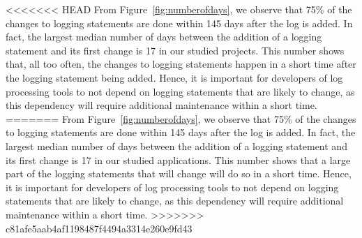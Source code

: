 <<<<<<< HEAD
From Figure~\ref{fig:numberofdays}, we observe that 75\% of the changes to logging statements are done within 145 days after the log is added. In fact, the largest median number of days between the addition of a logging statement and its first change is 17 in our studied projects. This number shows that, all too often, the changes to logging statements happen in a short time after the logging statement being added. Hence, it is important for developers of log processing tools to not depend on logging statements that are likely to change, as this dependency will require additional maintenance within a short time.
=======
From Figure~\ref{fig:numberofdays}, we observe that 75\% of the changes to logging statements are done within 145 days after the log is added. In fact, the largest median number of days between the addition of a logging statement and its first change is 17 in our studied applications. This number shows that a large part of the logging statements that will change will do so in a short time. Hence, it is important for developers of log processing tools to not depend on logging statements that are likely to change, as this dependency will require additional maintenance within a short time.
>>>>>>> c81afe5aab4af1198487f4494a3314e260e9fd43







